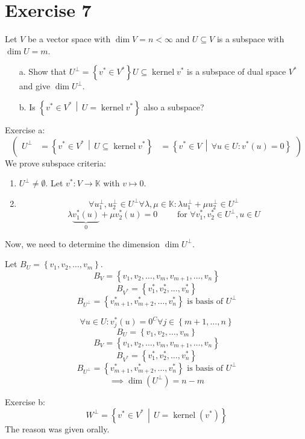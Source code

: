 \documentclass[a4paper]{article}
\theoremstyle{definition}
\DeclareMathOperator\kernel{kernel}
\newcommand\set[1]{\left\{#1\right\}}
\newcommand\setdef[2]{\left\{#1\,\middle|\,#2\right\}}
\begin{document}
\section{Exercise 7}
\begin{ex}
  Let $V$ be a vector space with $\dim{V} = n < \infty$
  and $U \subseteq V$ is a subspace with $\dim{U} = m$.
  \begin{enumerate}
    \item[a.] Show that $U^\bot = \set{v^* \in V^*}{U \subseteq \kernel{v^*}}$ is a subspace of dual space $V^*$ and give $\dim{U^{\bot}}$.
    \item[b.] Is $\setdef{v^* \in V^*}{U = \kernel{v^*}}$ also a subspace?
  \end{enumerate}
\end{ex}

Exercise a:
\[
  \begin{pmatrix}
    U^\bot &= \setdef{v^* \in V^*}{U \subseteq \kernel{v^*}}
           &= \setdef{v^* \in V}{\forall u \in U: v^*(u) = 0}
  \end{pmatrix}
\]
We prove subspace criteria:
\begin{enumerate}
  \item $U^\bot \neq \emptyset$. Let $v^*: V \to \mathbb K$ with $v \mapsto 0$.
  \item
    \[ \forall u^\bot_1, u^\bot_2 \in U^\bot \forall \lambda, \mu \in \mathbb K: \lambda u_1^\bot + \mu u_2^\bot \in U^\bot \]
    \[ \lambda \underbrace{v_1^*(u)}_{0} + \mu v_2^*(u) = 0  \qquad \text{ for } \forall v_1^*, v_2^* \in U^\bot, u \in U \]
\end{enumerate}

Now, we need to determine the dimension $\dim{U^{\bot}}$.

Let $B_U = \set{v_1, v_2, \dots, v_m}$.
\[ B_V = \set{v_1, v_2, \dots, v_m, v_{m+1}, \dots, v_n} \]
\[ B_{V^*} = \set{v_1^*, v_2^*, \dots, v_n^*} \]
\[ B_{U^{\bot}} = \set{v_{m+1}^*, v_{m+2}^*, \dots, v_n^*} \text{ is basis of } U^\bot \]

\[ \forall u \in U: v^*_j(u) = 0^C \forall j \in \set{m+1, \dots, n} \]
\[ B_U = \set{v_1, v_2, \dots, v_m} \]
\[ B_V = \set{v_1, v_2, \dots, v_m, v_{m+1}, \dots, v_n} \]
\[ B_{V^*} = \set{v_1^*, v_2^*, \dots, v_n^*} \]
\[ B_{U^\bot} = \set{v_{m+1}^*, v_{m+2}^*, \dots, v_n^*} \text{ is basis of } U^\bot \]
\[ \implies \dim(U^\bot) = n - m \]

Exercise b:
\[ W^\bot = \setdef{v^* \in V^*}{U = \kernel(v^*)} \]
The reason was given orally.
\end{document}
